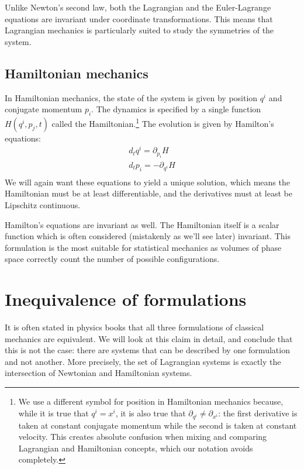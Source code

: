 Unlike Newton's second law, both the Lagrangian and the Euler-Lagrange equations are invariant under coordinate transformations. This means that Lagrangian mechanics is particularly suited to study the symmetries of the system.

\subsection{Hamiltonian mechanics}

In Hamiltonian mechanics, the state of the system is given by position $q^i$ and conjugate momentum $p_i$. The dynamics is specified by a single function $H(q^i, p_j, t)$ called the Hamiltonian.\footnote{We use a different symbol for position in Hamiltonian mechanics because, while it is true that $q^i = x^i$, it is also true that $\partial_{q^i} \neq \partial_{x^i}$: the first derivative is taken at constant conjugate momentum while the second is taken at constant velocity. This creates absolute confusion when mixing and comparing Lagrangian and Hamiltonian concepts, which our notation avoids completely.} The evolution is given by Hamilton's equations:
\begin{equation}\label{rp-cm-HamiltonEq}
	\begin{aligned}
		d_t q^i = \partial_{p_i} H \\
		d_t p_i = - \partial_{q^i} H \\
	\end{aligned}
\end{equation}
We will again want these equations to yield a unique solution, which means the Hamiltonian must be at least differentiable, and the derivatives must at least be Lipschitz continuous.

Hamilton's equations are invariant as well. The Hamiltonian itself is a scalar function which is often considered (mistakenly as we'll see later) invariant. This formulation is the most suitable for statistical mechanics as volumes of phase space correctly count the number of possible configurations.

\section{Inequivalence of formulations}\label{rp-cm-sec-inequivalenceOfFormulations}

It is often stated in physics books that all three formulations of classical mechanics are equivalent. We will look at this claim in detail, and conclude that this is not the case: there are systems that can be described by one formulation and not another. More precisely, the set of Lagrangian systems is exactly the intersection of Newtonian and Hamiltonian systems.

